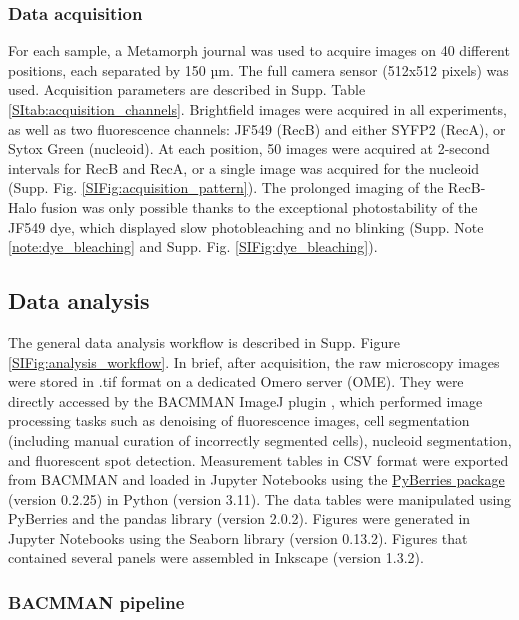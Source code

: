 \subsubsection*{Data acquisition}
For each sample, a Metamorph journal was used to acquire images on 40 different positions, each separated by 150 µm. The full camera sensor (512x512 pixels) was used. Acquisition parameters are described in Supp. Table \ref{SItab:acquisition_channels}. Brightfield images were acquired in all experiments, as well as two fluorescence channels: JF549 (RecB) and either SYFP2 (RecA), or Sytox Green (nucleoid). At each position, 50 images were acquired at 2-second intervals for RecB and RecA, or a single image was acquired for the nucleoid (Supp. Fig. \ref{SIFig:acquisition_pattern}). The prolonged imaging of the RecB-Halo fusion was only possible thanks to the exceptional photostability of the JF549 dye, which displayed slow photobleaching and no blinking (Supp. Note \ref{note:dye_bleaching} and Supp. Fig. \ref{SIFig:dye_bleaching}).

\subsection*{Data analysis}
The general data analysis workflow is described in Supp. Figure \ref{SIFig:analysis_workflow}. In brief, after acquisition, the raw microscopy images were stored in .tif format on a dedicated Omero server (OME). They were directly accessed by the BACMMAN ImageJ plugin \cite{Ollion2019}, which performed image processing tasks such as denoising of fluorescence images, cell segmentation (including manual curation of incorrectly segmented cells), nucleoid segmentation, and fluorescent spot detection. Measurement tables in CSV format were exported from BACMMAN and loaded in Jupyter Notebooks using the \href{https://gitlab.com/MEKlab/pyberries}{PyBerries package} (version 0.2.25) in Python (version 3.11). The data tables were manipulated using PyBerries and the pandas library (version 2.0.2). Figures were generated in Jupyter Notebooks using the Seaborn library (version 0.13.2). Figures that contained several panels were assembled in Inkscape (version 1.3.2).

\subsubsection*{BACMMAN pipeline}
